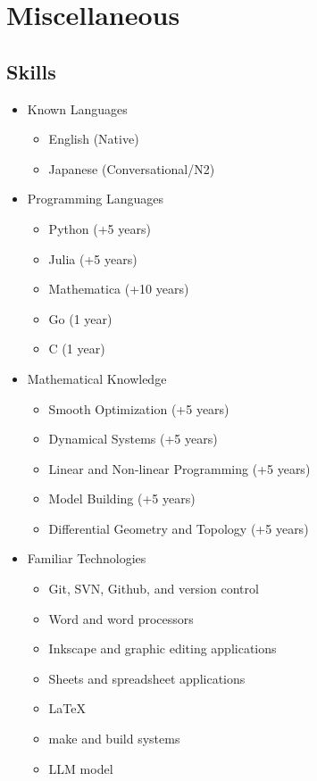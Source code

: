 \documentclass[fontsize=12pt]{article}
\begin{document}
\importdata











\section*{Miscellaneous}

\subsection*{Skills}

\begin{itemize}
  \item Known Languages
    \begin{itemize}
      \item English (Native)
      \item Japanese (Conversational/N2)
    \end{itemize}
  \item Programming Languages
    \begin{itemize}
      \item Python (+5 years)
      \item Julia (+5 years)
      \item Mathematica (+10 years)
      \item Go (1 year)
      \item C (1 year)
    \end{itemize}
  \item Mathematical Knowledge
    \begin{itemize}
      \item Smooth Optimization (+5 years)
      \item Dynamical Systems (+5 years)
      \item Linear and Non-linear Programming (+5 years)
      \item Model Building (+5 years)
      \item Differential Geometry and Topology (+5 years)
    \end{itemize}
  \item Familiar Technologies
    \begin{itemize}
      \item Git, SVN, Github, and version control
      \item Word and word processors
      \item Inkscape and graphic editing applications
      \item Sheets and spreadsheet applications
      \item LaTeX
      \item make and build systems
      \item LLM model
    \end{itemize}
\end{itemize}
\end{document}
